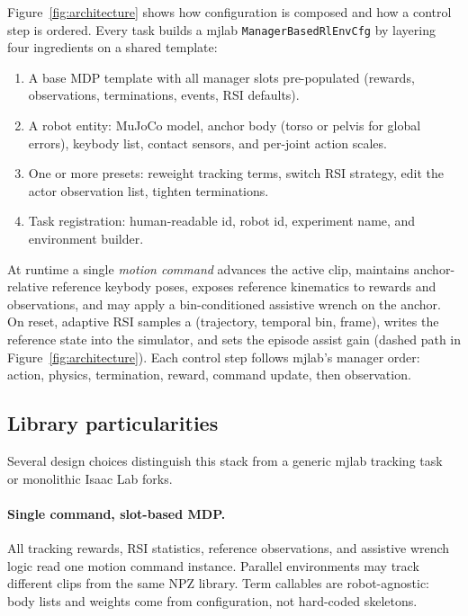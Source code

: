 \documentclass[11pt,a4paper]{article}
\begin{document}
Figure~\ref{fig:architecture} shows how configuration is composed and how a control
step is ordered. Every task builds a mjlab \texttt{ManagerBasedRlEnvCfg} by
layering four ingredients on a shared template:

\begin{enumerate}[leftmargin=1.4em,itemsep=0.15em]
  \item A base MDP template with all manager slots pre-populated (rewards,
        observations, terminations, events, RSI defaults).
  \item A robot entity: MuJoCo model, anchor body (torso or pelvis for global
        errors), keybody list, contact sensors, and per-joint action scales.
  \item One or more presets: reweight tracking terms, switch RSI strategy,
        edit the actor observation list, tighten terminations.
  \item Task registration: human-readable id, robot id, experiment name, and
        environment builder.
\end{enumerate}

At runtime a single \emph{motion command} advances the active clip, maintains
anchor-relative reference keybody poses, exposes reference kinematics to rewards
and observations, and may apply a bin-conditioned assistive wrench on the anchor.
On reset, adaptive RSI samples a (trajectory, temporal bin, frame), writes the
reference state into the simulator, and sets the episode assist gain (dashed path
in Figure~\ref{fig:architecture}). Each control step follows mjlab's manager order:
action, physics, termination, reward, command update, then observation.

\subsection{Library particularities}
\label{sec:particularities}
Several design choices distinguish this stack from a generic mjlab tracking
task~\citep{zakka2026mjlab} or monolithic Isaac Lab forks.

\paragraph{Single command, slot-based MDP.}
All tracking rewards, RSI statistics, reference observations, and assistive
wrench logic read one motion command instance. Parallel environments may track
different clips from the same NPZ library. Term callables are robot-agnostic:
body lists and weights come from configuration, not hard-coded skeletons.
\end{document}
